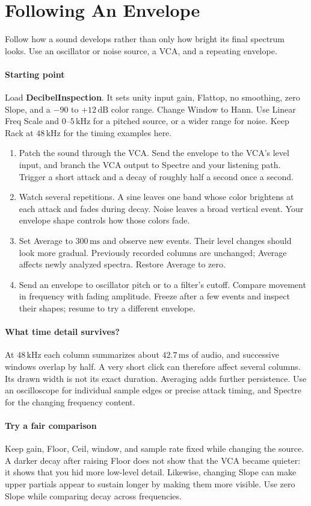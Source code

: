 \section{Following An Envelope}\label{sec:envelope}

Follow how a sound develops rather than only how bright its final spectrum
looks. Use an oscillator or noise source, a VCA, and a repeating envelope.

\paragraph{Starting point}
Load \textbf{DecibelInspection}. It sets unity input gain, Flattop, no
smoothing, zero Slope, and a $-90$ to $+12\,\mathrm{dB}$ color range.
Change Window to Hann. Use Linear Freq Scale and $0$--$5\,\mathrm{kHz}$
for a pitched source, or a wider range for noise. Keep Rack at
$48\,\mathrm{kHz}$ for the timing examples here.

\begin{enumerate}
  \item Patch the sound through the VCA. Send the envelope to the VCA's
  level input, and branch the VCA output to Spectre and your listening path.
  Trigger a short attack and a decay of roughly half a second once a second.
  \item Watch several repetitions. A sine leaves one band whose color
  brightens at each attack and fades during decay. Noise leaves a broad
  vertical event. Your envelope shape controls how those colors fade.
  \item Set Average to $300\,\mathrm{ms}$ and observe new events. Their
  level changes should look more gradual. Previously recorded columns are
  unchanged; Average affects newly analyzed spectra. Restore Average to zero.
  \item Send an envelope to oscillator pitch or to a filter's cutoff.
  Compare movement in frequency with fading amplitude. Freeze after a few
  events and inspect their shapes; resume to try a different envelope.
\end{enumerate}

\paragraph{What time detail survives?}
At $48\,\mathrm{kHz}$ each column summarizes about $42.7\,\mathrm{ms}$
of audio, and successive windows overlap by half. A very short click can
therefore affect several columns. Its drawn width is not its exact duration.
Averaging adds further persistence. Use an oscilloscope for individual sample
edges or precise attack timing, and Spectre for the changing frequency content.

\paragraph{Try a fair comparison}
Keep gain, Floor, Ceil, window, and sample rate fixed while changing the
source. A darker decay after raising Floor does not show that the VCA became
quieter: it shows that you hid more low-level detail. Likewise, changing
Slope can make upper partials appear to sustain longer by making them more
visible. Use zero Slope while comparing decay across frequencies.
